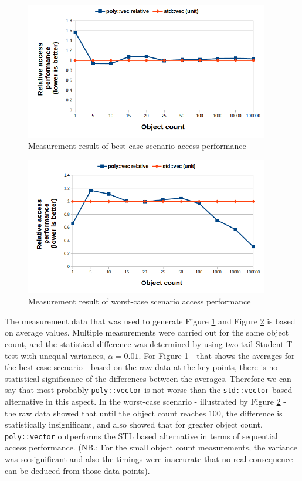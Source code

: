 \documentclass[a4paper,12pt]{article}
\begin{document}
\begin{figure}[!htb]
    \centering
    \includegraphics[width=0.95\textwidth]{acces-bc-meas.png}
    \caption{Measurement result of best-case scenario access performance}
    \label{fig:meas-access-bc}
\end{figure}
\begin{figure}[!htb]
    \centering
    \includegraphics[width=0.95\textwidth]{acces-wc-meas.png}
    \caption{Measurement result of worst-case scenario access performance}
    \label{fig:meas-access-wc}
\end{figure}

The measurement data that was used to generate Figure \ref{fig:meas-access-bc} and Figure \ref{fig:meas-access-wc} is based on average values. Multiple measurements were carried out for the same object count, and the statistical difference was determined by using two-tail Student T-test with unequal variances, $\alpha = 0.01$. For Figure \ref{fig:meas-access-bc} - that shows the averages for the best-case scenario - based on the raw data at the key points, there is no statistical significance of the differences between the averages. Therefore we can say that most probably \lstinline{poly::vector} is not worse than the \lstinline{std::vector} based alternative in this aspect. In the worst-case scenario - illustrated by Figure \ref{fig:meas-access-wc} - the raw data showed that until the object count reaches 100, the difference is statistically insignificant, and also showed that for greater object count, \lstinline{poly::vector} outperforms the STL based alternative in terms of sequential access performance. (NB.: For the small object count measurements, the variance was so significant and also the timings were inaccurate that no real consequence can be deduced from those data points).
\end{document}
